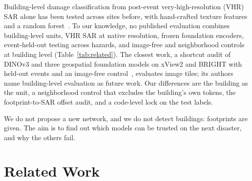 \documentclass{ieeeaccess}
\begin{document}
Building-level damage classification from post-event very-high-resolution (VHR) SAR alone has been tested across sites before, with hand-crafted texture features and a random forest~\cite{macchiarulo2025sar}. To our knowledge, no published evaluation combines building-level units, VHR SAR at native resolution, frozen foundation encoders, event-held-out testing across hazards, and image-free and neighborhood controls at building level (Table~\ref{tab:related}). The closest work, a shortcut audit of DINOv3 and three geospatial foundation models on xView2 and BRIGHT with held-out events and an image-free control~\cite{shibli2026shortcut}, evaluates image tiles; its authors name building-level evaluation as future work. Our differences are the building as the unit, a neighborhood control that excludes the building's own tokens, the footprint-to-SAR offset audit, and a code-level lock on the test labels.

We do not propose a new network, and we do not detect buildings: footprints are given. The aim is to find out which models can be trusted on the next disaster, and why the others fail.

\section{Related Work}
\label{sec:related}
\end{document}
